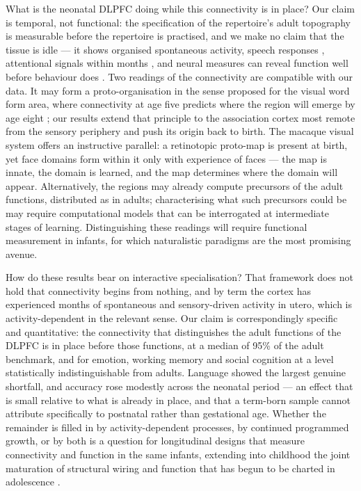 \documentclass[11pt]{article}
\begin{document}
What is the neonatal DLPFC doing while this connectivity is in place? Our
claim is temporal, not functional: the specification of the repertoire's
adult topography is measurable before the repertoire is practised, and we
make no claim that the tissue is idle --- it shows organised spontaneous
activity, speech responses \citep{mahmoudzadeh2013,dehaenelambertz2002},
attentional signals within months \citep{ellis2021}, and neural measures
can reveal function well before behaviour does \citep{odoherty2026}. Two
readings of the connectivity are compatible with our data. It may form a
proto-organisation in the sense proposed for the visual word form area,
where connectivity at age five predicts where the region will emerge by age
eight \citep{saygin2016,saygin2011,osher2016}; our results extend that
principle to the association cortex most remote from the sensory periphery
and push its origin back to birth. The macaque visual system offers an
instructive parallel: a retinotopic proto-map is present at birth, yet
face domains form within it only with experience of faces
\citep{arcaro2017proto,arcaro2017faces} --- the map is innate, the domain
is learned, and the map determines where the domain will appear.
Alternatively, the regions may already compute precursors of the adult
functions, distributed as in adults; characterising what such precursors
could be may require computational models that can be interrogated at
intermediate stages of learning. Distinguishing these readings will require
functional measurement in infants, for which naturalistic paradigms are the
most promising avenue.

How do these results bear on interactive specialisation? That framework
does not hold that connectivity begins from nothing, and by term the cortex
has experienced months of spontaneous and sensory-driven activity in utero,
which is activity-dependent in the relevant sense. Our claim is
correspondingly specific and quantitative: the connectivity that
distinguishes the adult functions of the DLPFC is in place before those
functions, at a median of 95\% of the adult benchmark, and for emotion,
working memory and social cognition at a level statistically
indistinguishable from adults. Language showed the largest genuine
shortfall, and accuracy rose modestly across the neonatal period --- an
effect that is small relative to what is already in place, and that a
term-born sample cannot attribute specifically to postnatal rather than
gestational age. Whether the remainder is filled in by activity-dependent
processes, by continued programmed growth, or by both is a question for
longitudinal designs that measure connectivity and function in the same
infants, extending into childhood the joint maturation of structural wiring
and function that has begun to be charted in adolescence \citep{park2022}.
\end{document}
